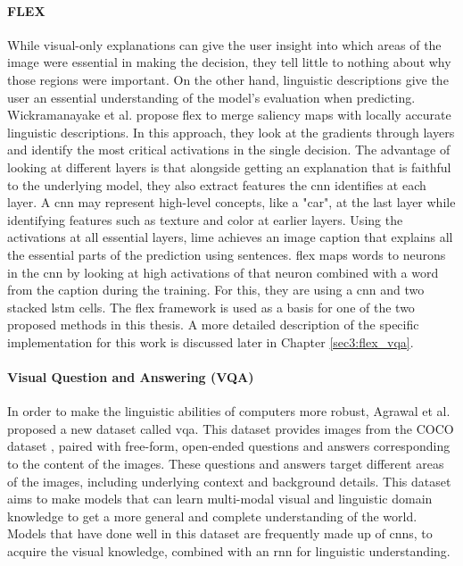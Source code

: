 

\paragraph{FLEX\\}
While visual-only explanations can give the user insight into which areas of the image were essential in making the decision, they tell little to nothing about why those regions were important. On the other hand, linguistic descriptions give the user an essential understanding of the model's evaluation when predicting. 
Wickramanayake et al. \cite{wickramanayakeFLEXFaithfulLinguistic2019} propose \gls{flex} to merge saliency maps with locally accurate linguistic descriptions. In this approach, they look at the gradients through layers and identify the most critical activations in the single decision. The advantage of looking at different layers is that alongside getting an explanation that is faithful to the underlying model, they also extract features the \gls{cnn} identifies at each layer. A \gls{cnn} may represent high-level concepts, like a "car", at the last layer while identifying features such as texture and color at earlier layers. Using the activations at all essential layers, \gls{lime} achieves an image caption that explains all the essential parts of the prediction using sentences. \gls{flex} maps words to neurons in the \gls{cnn} by looking at high activations of that neuron combined with a word from the caption during the training. For this, they are using a \gls{cnn} and two stacked \gls{lstm} \cite{hochreiterLongShorttermMemory1997} cells.
The \gls{flex} framework is used as a basis for one of the two proposed methods in this thesis. A more detailed description of the specific implementation for this work is discussed later in Chapter \ref{sec3:flex_vqa}.

\paragraph{Visual Question and Answering (VQA)\\}
In order to make the linguistic abilities of computers more robust, Agrawal et al. \cite{agrawalVQAVisualQuestion2016} proposed a new dataset called \gls{vqa}. This dataset provides images from the COCO dataset \cite{linMicrosoftCOCOCommon2015}, paired with free-form, open-ended questions and answers corresponding to the content of the images. These questions and answers target different areas of the images, including underlying context and background details. This dataset aims to make models that can learn multi-modal visual and linguistic domain knowledge to get a more general and complete understanding of the world. Models that have done well in this dataset are frequently made up of \glspl{cnn}, to acquire the visual knowledge, combined with an \gls{rnn} %
for linguistic understanding.

